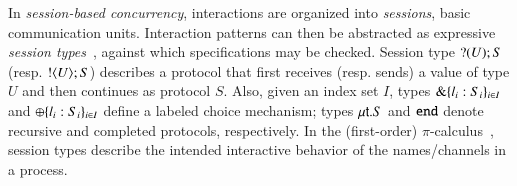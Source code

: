 In \emph{session-based concurrency}, interactions are organized into \emph{sessions}, basic communication units.
Interaction patterns can then be abstracted as expressive \emph{session types}~\cite{honda.vasconcelos.kubo:language-primitives}, against which  specifications may be checked. 
Session type $? (U) ; S$ (resp.  $! \langle U \rangle ; S$)
describes a protocol that first receives (resp. sends) a value of type $U$ and then continues as protocol $S$.
Also, given an index set $I$, types $\& \{l_i:S_i\}_{i \in I}$ 
and $\oplus \{l_i:S_i\}_{i \in I}$ 
define %
 a labeled choice mechanism; types 
$\mu\mathsf{t}.S$ 
and 
$\mathtt{end}$ denote recursive and completed protocols, respectively.
In the (first-order) $\pi$-calculus~\cite{MilnerR:calmp1}, 
session types describe the intended interactive behavior of the names/channels in a process.

